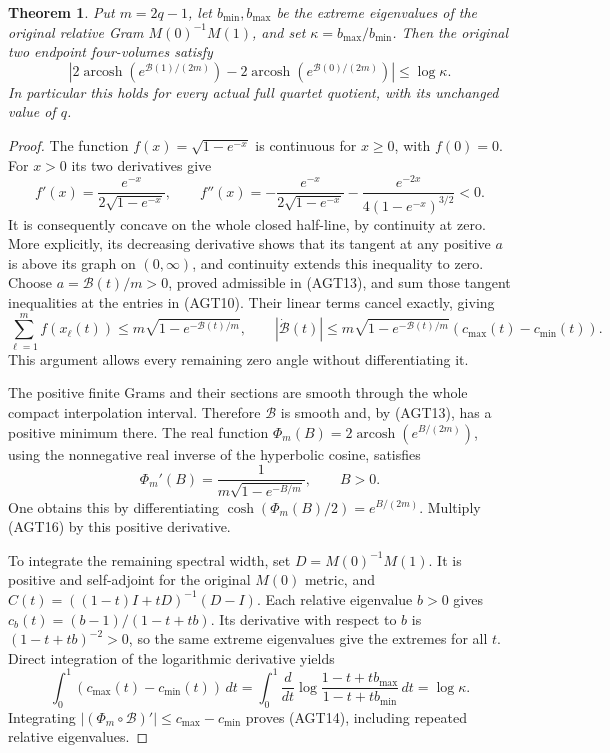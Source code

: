 \documentclass[11pt]{article}
\newtheorem{theorem}{Theorem}
\begin{document}
\begin{theorem}
Put $m=2q-1$, let $b_{\min},b_{\max}$ be the extreme
eigenvalues of the original relative Gram
$M(0)^{-1}M(1)$, and set $\kappa=b_{\max}/b_{\min}$.
Then the original two endpoint four-volumes satisfy
\[
 \left|2\operatorname{arcosh}\!\left(e^{\mathcal B(1)/(2m)}\right)
       -2\operatorname{arcosh}\!\left(e^{\mathcal B(0)/(2m)}\right)
 \right|\le\log\kappa.
 \tag{AGT14}
\]
In particular this holds for every actual full quartet
quotient, with its unchanged value of $q$.
\end{theorem}
\begin{proof}
The function $f(x)=\sqrt{1-e^{-x}}$ is continuous for $x\ge0$,
with $f(0)=0$. For $x>0$ its two derivatives give
\[
 f'(x)=\frac{e^{-x}}{2\sqrt{1-e^{-x}}},\qquad
 f''(x)=-\frac{e^{-x}}{2\sqrt{1-e^{-x}}}
        -\frac{e^{-2x}}{4(1-e^{-x})^{3/2}}<0.
 \tag{AGT15}
\]
It is consequently concave on the whole closed half-line,
by continuity at zero. More explicitly, its decreasing
derivative shows that its tangent at any positive $a$ is
above its graph on $(0,\infty)$, and continuity extends
this inequality to zero. Choose
$a=\mathcal B(t)/m>0$, proved admissible in (AGT13), and
sum those tangent inequalities at the entries in (AGT10).
Their linear terms cancel exactly, giving
\[
 \sum_{\ell=1}^m f(x_\ell(t))
 \le m\sqrt{1-e^{-\mathcal B(t)/m}},\qquad
 |\dot{\mathcal B}(t)|
 \le m\sqrt{1-e^{-\mathcal B(t)/m}}
                 (c_{\max}(t)-c_{\min}(t)).
 \tag{AGT16}
\]
This argument allows every remaining zero angle without
differentiating it.

The positive finite Grams and their sections are smooth
through the whole compact interpolation interval. Therefore
$\mathcal B$ is smooth and, by (AGT13), has a positive
minimum there. The real function
$\Phi_m(B)=2\operatorname{arcosh}(e^{B/(2m)})$, using the
nonnegative real inverse of the hyperbolic cosine, satisfies
\[
 \Phi_m'(B)=\frac{1}{m\sqrt{1-e^{-B/m}}},\qquad B>0.
 \tag{AGT17}
\]
One obtains this by differentiating
$\cosh(\Phi_m(B)/2)=e^{B/(2m)}$. Multiply (AGT16) by
this positive derivative.

To integrate the remaining spectral width, set
$D=M(0)^{-1}M(1)$. It is positive and self-adjoint for the
original $M(0)$ metric, and
$C(t)=((1-t)I+tD)^{-1}(D-I)$. Each relative eigenvalue
$b>0$ gives $c_b(t)=(b-1)/(1-t+tb)$.
Its derivative with respect to $b$ is $(1-t+tb)^{-2}>0$,
so the same extreme eigenvalues give the extremes for all
$t$. Direct integration of the logarithmic derivative yields
\[
 \int_0^1(c_{\max}(t)-c_{\min}(t))\,dt
 =\int_0^1\frac{d}{dt}
      \log\frac{1-t+tb_{\max}}{1-t+tb_{\min}}\,dt
 =\log\kappa.
 \tag{AGT18}
\]
Integrating $|(\Phi_m\circ\mathcal B)'|\le c_{\max}-c_{\min}$
proves (AGT14), including repeated relative eigenvalues.
\end{proof}
\end{document}
